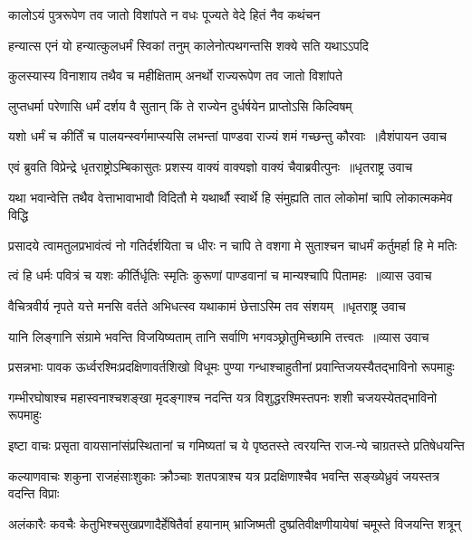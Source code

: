\twolineshloka
{कालोऽयं पुत्ररूपेण तव जातो विशांपते}
{न वधः पूज्यते वेदे हितं नैव कथंचन}


\twolineshloka
{हन्यात्स एनं यो हन्यात्कुलधर्मं स्विकां तनुम्}
{कालेनोत्पथगन्तसि शक्ये सति यथाऽऽपदि}


\twolineshloka
{कुलस्यास्य विनाशाय तथैव च महीक्षिताम्}
{अनर्थो राज्यरूपेण तव जातो विशांपते}


\twolineshloka
{लुप्तधर्मा परेणासि धर्मं दर्शय वै सुतान्}
{किं ते राज्येन दुर्धर्षयेन प्राप्तोऽसि किल्विषम्}


\threelineshloka
{यशो धर्मं च कीर्तिं च पालयन्स्वर्गमाप्स्यसि}
{लभन्तां पाण्डवा राज्यं शमं गच्छन्तु कौरवाः ॥वैशंपायन उवाच}
{}


\threelineshloka
{एवं ब्रुवति विप्रेन्द्रे धृतराष्ट्रोऽम्बिकासुतः}
{प्रशस्य वाक्यं वाक्यज्ञो वाक्यं चैवाब्रवीत्पुनः ॥धृतराष्ट्र उवाच}
{}


\twolineshloka
{यथा भवान्वेत्ति तथैव वेत्ताभावाभावौ विदितौ मे यथार्थौ}
{स्वार्थे हि संमुह्यति तात लोकोमां चापि लोकात्मकमेव विद्धि}


\twolineshloka
{प्रसादये त्वामतुलप्रभावंत्वं नो गतिर्दर्शयिता च धीरः}
{न चापि ते वशगा मे सुताश्चन चाधर्मं कर्तुमर्हा हि मे मतिः}


\threelineshloka
{त्वं हि धर्मः पवित्रं च यशः कीर्तिर्धृतिः स्मृतिः}
{कुरूणां पाण्डवानां च मान्यश्चापि पितामहः ॥व्यास उवाच}
{}


\threelineshloka
{वैचित्रवीर्य नृपते यत्ते मनसि वर्तते}
{अभिधत्स्व यथाकामं छेत्ताऽस्मि तव संशयम् ॥धृतराष्ट्र उवाच}
{}


\threelineshloka
{यानि लिङ्गानि संग्रामे भवन्ति विजयिष्यताम्}
{तानि सर्वाणि भगवञ्छ्रोतुमिच्छामि तत्त्वतः ॥व्यास उवाच}
{}


\twolineshloka
{प्रसन्नभाः पावक ऊर्ध्वरश्मिःप्रदक्षिणावर्तशिखो विधूमः}
{पुण्या गन्धाश्चाहुतीनां प्रवान्तिजयस्यैतद्भाविनो रूपमाहुः}


\twolineshloka
{गम्भीरघोषाश्च महास्वनाश्चशङ्खा मृदङ्गाश्च नदन्ति यत्र}
{विशुद्धरश्मिस्तपनः शशी चजयस्येतद्भाविनो रूपमाहुः}


\twolineshloka
{इष्टा वाचः प्रसृता वायसानांसंप्रस्थितानां च गमिष्यतां च}
{ये पृष्ठतस्ते त्वरयन्ति राज-न्ये चाग्रतस्ते प्रतिषेधयन्ति}


\twolineshloka
{कल्याणवाचः शकुना राजहंसाःशुकाः क्रौञ्चाः शतपत्राश्च यत्र}
{प्रदक्षिणाश्चैव भवन्ति सङ्ख्येध्रुवं जयस्तत्र वदन्ति विप्राः}


\twolineshloka
{अलंकारैः कवचैः केतुभिश्चसुखप्रणादैर्हेषितैर्वा हयानाम्}
{भ्राजिष्मती दुष्प्रतिवीक्षणीयायेषां चमूस्ते विजयन्ति शत्रून्}


